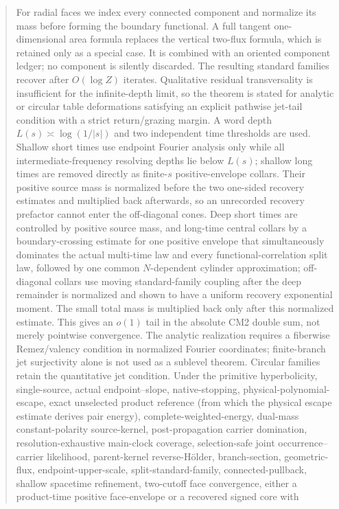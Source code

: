 \documentclass[11pt]{article}
\begin{document}
\begin{abstract}
For radial faces we index every connected component and normalize its mass
before forming the boundary functional.  A full tangent one-dimensional area
formula replaces the vertical two-flux formula, which is retained only as a
special case.  It is combined with an oriented component ledger; no component is silently
discarded.  The resulting standard families recover after $O(\log Z)$
iterates.  Qualitative residual transversality is insufficient for the
infinite-depth limit, so the theorem is stated for analytic or circular table
deformations satisfying an explicit pathwise jet-tail condition with a
strict return/grazing margin.  A word depth $L(s)\asymp\log(1/|s|)$ and two
independent time thresholds are used.  Shallow short times use endpoint
Fourier analysis only while all intermediate-frequency resolving depths lie
below $L(s)$; shallow long times are removed directly as finite-$s$
positive-envelope collars.  Their positive source mass is normalized before
the two one-sided recovery estimates and multiplied back afterwards, so an
unrecorded recovery prefactor cannot enter the off-diagonal cones.
Deep short times are controlled by positive source mass, and long-time
central collars by a boundary-crossing estimate for
one positive envelope that simultaneously dominates the actual multi-time law
and every functional-correlation split law, followed by one common
$N$-dependent cylinder approximation;
off-diagonal collars use moving standard-family coupling after the deep
remainder is normalized and shown to have a uniform recovery exponential
moment.  The small total mass is multiplied back only after this normalized
estimate.  This gives an
$o(1)$ tail in the absolute CM2 double sum, not merely pointwise convergence.
The analytic realization requires a fiberwise Remez/valency condition in
normalized Fourier coordinates; finite-branch jet surjectivity alone is not
used as a sublevel theorem.  Circular families retain the quantitative jet
condition.  Under the primitive hyperbolicity, single-source, actual
endpoint--slope, native-stopping, physical-polynomial-escape, exact
unselected product reference (from which the physical escape estimate
derives pair energy), complete-weighted-energy, dual-mass
constant-polarity source-kernel, post-propagation carrier domination,
resolution-exhaustive main-clock
coverage, selection-safe joint occurrence--carrier likelihood,
parent-kernel reverse-H\"older, branch-section,
geometric-flux, endpoint-upper-scale, split-standard-family,
connected-pullback, shallow spacetime refinement, two-cutoff face convergence,
either a product-time positive face-envelope or a recovered signed core with

\end{abstract}
\end{document}
